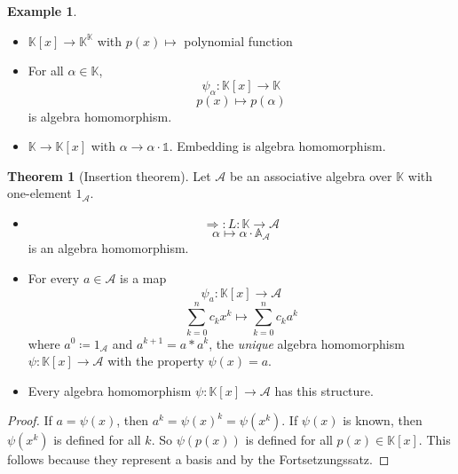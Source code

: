 \documentclass[a4paper,landscape,twocolumn]{article}
\theoremstyle{definition}
\newtheorem{theorem}{Theorem}
\newtheorem{ex}{Example}
\begin{document}
\begin{ex}
  \label{ex-9.11}
  \begin{itemize}
    \item $\mathbb K[x] \to {\mathbb K}^{\mathbb K}$ with $p(x) \mapsto$ polynomial function
    \item For all $\alpha \in \mathbb K$,
      \[ \psi_\alpha: \mathbb K[x] \to \mathbb K \]
      \[ p(x) \mapsto p(\alpha) \]
      is algebra homomorphism.
    \item $\mathbb K \to \mathbb K[x]$ with $\alpha \to \alpha \cdot \mathbb 1$.
      Embedding is algebra homomorphism.
  \end{itemize}
\end{ex}

\begin{theorem}[Insertion theorem] %
  \label{theorem-9.12}
  Let $\mathcal A$ be an associative algebra over $\mathbb K$ with one-element
  $1_{\mathcal A}$.
  \begin{itemize}
    \item
      \[ \Rightarrow: L: \mathbb K \to \mathcal A \]
      \[ \alpha \mapsto \alpha \cdot {\mathbb A_{\mathcal A}} \]
      is an algebra homomorphism.
    \item For every $a \in \mathcal A$ is a map
      \[ \psi_a: \mathbb K[x] \to \mathcal A \]
      \[ \sum_{k=0}^n c_k x^k \mapsto \sum_{k=0}^n c_k a^k \]
      where $a^0 \coloneqq 1_{\mathcal A}$ and $a^{k+1} = a * a^k$,
      the \emph{unique} algebra homomorphism $\psi: \mathbb K[x] \to \mathcal A$
      with the property $\psi(x) = a$.

    \item
      Every algebra homomorphism $\psi: \mathbb K[x] \to \mathcal A$ has this structure.
  \end{itemize}
\end{theorem}
\begin{proof}
  If $a = \psi(x)$, then $a^k = \psi(x)^k = \psi(x^k)$.
  If $\psi(x)$ is known, then $\psi(x^k)$ is defined for all $k$.
  So $\psi(p(x))$ is defined for all $p(x) \in \mathbb K[x]$.
  This follows because they represent a basis and by the Fortsetzungssatz. %
\end{proof}
\end{document}
